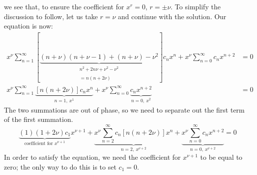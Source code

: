 we see that, to ensure the coefficient for $x^r = 0$, $r = \pm \nu$.
To simplify the discussion to follow, let us take $r = \nu$ and continue with the solution.  Our equation is now: 
\begin{align*}
x^{\nu}\sum\limits_{n=1}^{\infty}\left[\underbrace{(n+\nu)(n+\nu-1) + (n+\nu)-\nu^2}_{\substack{n^2+2n\nu+\nu^2 - \nu^2 \\ \\ =n(n+2\nu)}} \right]c_nx^n + x^{\nu}\sum\limits_{n=0}^{\infty}c_n x^{n+2} &= 0 \\
x^{\nu}\sum\limits_{n=1}^{\infty} \underbrace{\left[n(n+2\nu) \right]c_nx^n}_{n=1, \ x^1} + x^{\nu}\sum\limits_{n=0}^{\infty}\underbrace{c_nx^{n+2}}_{n=0, \ x^2} &= 0
\end{align*}
The two summations are out of phase, so we need to separate out the first term of the first summation.
\begin{equation*}
\underbrace{(1)(1+2\nu)c_1}_{\text{coefficient for }x^{\nu+1}}x^{\nu+1} + \underbrace{x^{\nu}\sum\limits_{n=2}^{\infty}c_n[n(n+2\nu)]x^n}_{n=2, \ x^{\nu+2}} + \underbrace{x^{\nu}\sum\limits_{n=0}^{\infty}c_nx^{n+2}}_{n=0, \ x^{\nu+2}} = 0
\end{equation*}
In order to satisfy the equation, we need the coefficient for $x^{\nu+1}$ to be equal to zero; the only way to do this is to set $c_1 = 0$.

